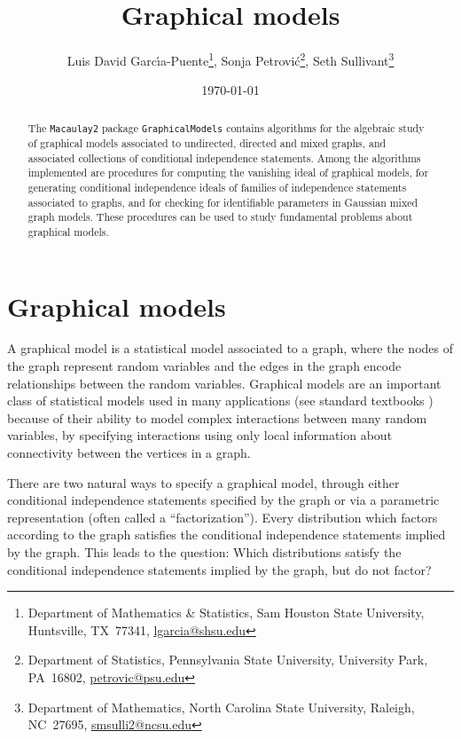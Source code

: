 \documentclass[letterpaper]{article}
\title{Graphical models}
\author{Luis David  Garc\'{\i}a-Puente\footnote{Department of Mathematics \& Statistics,         Sam Houston State University,          Huntsville, TX\ 77341, \href{mailto:lgarcia@shsu.edu}{lgarcia@shsu.edu}},
 Sonja Petrovi\'c\footnote{Department of Statistics,       Pennsylvania State University,           University Park, PA\ 16802, \href{mailto:petrovic@psu.edu}{petrovic@psu.edu}}, 
 Seth Sullivant\footnote{Department of Mathematics,   North Carolina State University, Raleigh, NC\ 27695, \href{mailto:smsulli2@ncsu.edu}{smsulli2@ncsu.edu}}}
\date{\today}
\theoremstyle{plain}
\theoremstyle{definition}
\begin{document}
\maketitle


\begin{abstract}
The {\tt Macaulay2} package {\tt GraphicalModels} contains algorithms 
for the algebraic study of graphical models associated to undirected, 
directed and mixed graphs, 
and associated collections of 
conditional independence statements. 
Among the algorithms implemented are procedures for computing
the vanishing ideal of graphical models, for generating
conditional independence ideals of families of independence statements
associated to graphs, and for checking for identifiable parameters
in Gaussian mixed graph models.
These procedures can be used to study fundamental 
problems about graphical models. 
\end{abstract}


\section{Graphical models}\label{intro}

A graphical model is a statistical model associated to a graph,
where the nodes of the graph represent random variables and the
edges in the graph encode relationships between the random variables.
Graphical models are an important class of statistical models used
in many applications (see standard textbooks \cite{Lauritzen, Whitaker})
because of their ability to model complex interactions between
many random variables, by specifying
interactions using only local information about connectivity
between the vertices in a graph.

There are two natural ways to specify a graphical model, through 
either conditional independence statements specified by the graph
or via a parametric representation (often called a ``factorization'').
Every distribution which factors according to the graph
satisfies the conditional independence statements implied by the 
graph. This leads to the question:  Which distributions satisfy the conditional
independence statements implied by the graph, but do not factor?
\end{document}
